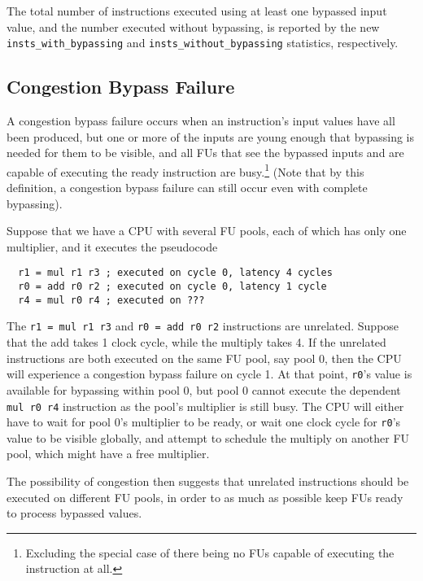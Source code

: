 \documentclass[11pt]{article}
\begin{document}
The total number of instructions executed using at least one bypassed
input value, and the number executed without bypassing, is reported by
the new \texttt{insts\_with\_bypassing} and
\texttt{insts\_without\_bypassing} statistics, respectively.

\subsection{Congestion Bypass Failure}

A congestion bypass failure occurs when an instruction's input values
have all been produced, but one or more of the inputs are young enough
that bypassing is needed for them to be visible, and all FUs that see
the bypassed inputs and are capable of executing the ready instruction
are busy.\footnote{Excluding the special case of there being no FUs
  capable of executing the instruction at all.} (Note that by this
definition, a congestion bypass failure can still occur even with
complete bypassing).

Suppose that we have a CPU with several FU pools, each of which
has only one multiplier, and it executes the pseudocode
\begin{verbatim}
  r1 = mul r1 r3 ; executed on cycle 0, latency 4 cycles
  r0 = add r0 r2 ; executed on cycle 0, latency 1 cycle
  r4 = mul r0 r4 ; executed on ???
\end{verbatim}
The \texttt{r1 = mul r1 r3} and \texttt{r0 = add r0 r2} instructions
are unrelated. Suppose that the add takes 1 clock cycle, while the
multiply takes 4. If the unrelated instructions are both executed on
the same FU pool, say pool 0, then the CPU will experience a
congestion bypass failure on cycle 1. At that point, \texttt{r0}'s
value is available for bypassing within pool 0, but pool 0 cannot
execute the dependent \texttt{mul r0 r4} instruction as the pool's
multiplier is still busy. The CPU will either have to wait for pool
0's multiplier to be ready, or wait one clock cycle for \texttt{r0}'s
value to be visible globally, and attempt to schedule the multiply on
another FU pool, which might have a free multiplier.

The possibility of congestion then suggests that unrelated
instructions should be executed on different FU pools, in order to
as much as possible keep FUs ready to process bypassed values.
\end{document}
